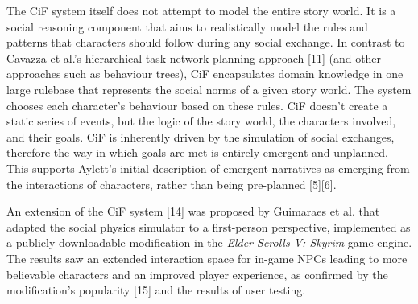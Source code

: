\documentclass{sig-alternate-05-2015}
\begin{document}
The CiF system itself does not attempt to model the entire story world. It is a social reasoning component that aims to realistically model the rules and patterns that characters should follow during any social exchange. In contrast to Cavazza et al.'s hierarchical task network planning approach [11] (and other approaches such as behaviour trees), CiF encapsulates domain knowledge in one large rulebase that represents the social norms of a given story world. The system chooses each character's behaviour based on these rules. CiF doesn't create a static series of events, but the logic of the story world, the characters involved, and their goals. CiF is inherently driven by the simulation of social exchanges, therefore the way in which goals are met is entirely emergent and unplanned. This supports Aylett's initial description of emergent narratives as emerging from the interactions of characters, rather than being pre-planned [5][6].

An extension of the CiF system [14] was proposed by Guimaraes et al. that adapted the social physics simulator to a first-person perspective, implemented as a publicly downloadable modification in the \textit{Elder Scrolls V: Skyrim} game engine. The results saw an extended interaction space for in-game NPCs leading to more believable characters and an improved player experience, as confirmed by the modification's popularity [15] and the results of user testing.
\end{document}
